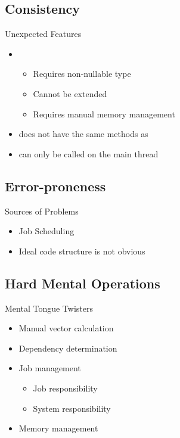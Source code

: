 \subsection{Consistency}
\begin{frame}{\secname}{\subsecname}
	Unexpected Features
	\begin{itemize}
		\item {}
		\begin{itemize}
			\item Requires non-nullable type
			\item Cannot be extended
			\item Requires manual memory management
		\end{itemize}
		\item {} does not have the same methods as 
		\item {} can only be called on the main thread
	\end{itemize}
\end{frame}

\subsection{Error-proneness}
\begin{frame}{\secname}{\subsecname}
	Sources of Problems
	\begin{itemize}
		\item Job Scheduling
		\item Ideal code structure is not obvious
	\end{itemize}
\end{frame}

\subsection{Hard Mental Operations}
\begin{frame}{\secname}{\subsecname}
	Mental Tongue Twisters
	\begin{itemize}
		\item Manual vector calculation
		\item Dependency determination
		\item Job management
		\begin{itemize}
			\item Job responsibility
			\item System responsibility
		\end{itemize}
		\item Memory management
	\end{itemize}
\end{frame}

